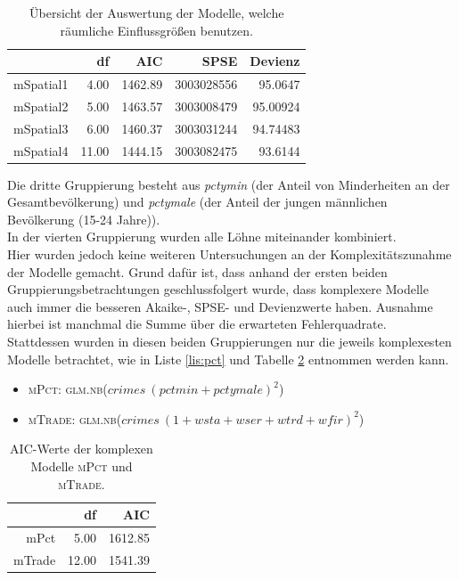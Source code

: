 \begin{table}[ht]
\centering
\begin{tabular}{rrrrr}
  \hline
 & df & AIC & SPSE & Devienz\\ 
  \hline
  mSpatial1 & 4.00 & 1462.89 & 3003028556 & 95.0647\\ 
  mSpatial2 & 5.00 & 1463.57 & 3003008479 & 95.00924\\ 
  mSpatial3 & 6.00 & 1460.37 & 3003031244 & 94.74483\\ 
  mSpatial4 & 11.00 & 1444.15 & 3003082475 & 93.6144\\ 
   \hline
\end{tabular}
\caption{\"Ubersicht der Auswertung der Modelle, welche r\"aumliche Einflussgr\"o\ss{}en benutzen.}
\label{tab:spa}
\end{table}

\par\smallskip
Die dritte Gruppierung besteht aus \textit{pctymin} (der Anteil von Minderheiten an der Gesamtbev\"olkerung) und \textit{pctymale} (der Anteil der jungen m\"annlichen Bev\"olkerung (15-24 Jahre)). 
\\
In der vierten Gruppierung wurden alle L\"ohne miteinander kombiniert. \\
Hier wurden jedoch keine weiteren Untersuchungen an der Komplexit\"atszunahme der Modelle gemacht.
Grund daf\"ur ist, dass anhand der ersten beiden Gruppierungsbetrachtungen geschlussfolgert wurde, dass komplexere Modelle auch immer die besseren Akaike-, SPSE- und Devienzwerte haben.
Ausnahme hierbei ist manchmal die Summe \"uber die erwarteten Fehlerquadrate. \\
Stattdessen wurden in diesen beiden Gruppierungen nur die jeweils komplexesten Modelle betrachtet, wie in Liste \ref{lis:pct} und Tabelle \ref{tab:pct} entnommen werden kann.


\begin{itemize}
\item \textsc{mPct: glm.nb($crimes~(pctmin+pctymale)^2$)}
\item \textsc{mTrade: glm.nb($crimes~(1+wsta+wser+wtrd+wfir)^2$)}
\label{lis:pct}
\end{itemize}

\begin{table}[ht]
\centering
\begin{tabular}{rrr}
  \hline
 & df & AIC \\ 
  \hline
mPct & 5.00 & 1612.85 \\ 
  mTrade & 12.00 & 1541.39 \\ 
   \hline
\end{tabular}
\caption{AIC-Werte der komplexen Modelle \textsc{mPct} und \textsc{mTrade}.}
\label{tab:pct}
\end{table}

